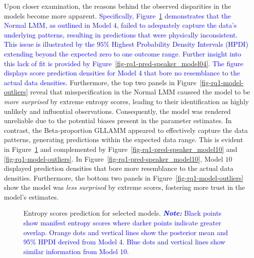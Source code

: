 \documentclass[
  authoryear,
  preprint,
  1p]{elsarticle}
\begin{document}
Upon closer examination, the reasons behind the observed disparities in
the models become more apparent. \textcolor{blue}{Specifically,
Figure~\ref{fig-rq1-pred-speaker} demonstrates that the Normal LMM, as
outlined in Model \(4\), failed to adequately capture the data's
underlying patterns, resulting in predictions that were physically
inconsistent. This issue is illustrated by the \(95\%\) Highest
Probability Density Intervals (HPDI) extending beyond the expected zero
to one outcome range. Further insight into this lack of fit is provided
by Figure~\ref{fig-rq1-pred-speaker_model04}. The figure displays score
prediction densities for Model \(4\) that bore no resemblance to the
actual data densities.} Furthermore, the top two panels in
Figure~\ref{fig-rq1-model-outliers} reveal that misspecification in the
Normal LMM causeed the model to be \emph{more surprised} by extreme
entropy scores, leading to their identification as highly unlikely and
influential observations. Consequently, the model was rendered
unreliable due to the potential biases present in the parameter
estimates. In contrast, the Beta-proportion GLLAMM appeared to
effectively capture the data patterns, generating predictions within the
expected data range. This is evident in
Figure~\ref{fig-rq1-pred-speaker} and complemented by
Figure~\ref{fig-rq1-pred-speaker_model10} and
\ref{fig-rq1-model-outliers}. In
Figure~\ref{fig-rq1-pred-speaker_model10}, Model \(10\) displayed
prediction densities that bore more resemblance to the actual data
densities. Furthermore, the bottom two panels in
Figure~\ref{fig-rq1-model-outliers} show the model was \emph{less
surprised} by extreme scores, fostering more trust in the model's
estimates.

\label{cell-fig-rq1-pred-speaker}
\begin{figure}[H]


\caption{\label{fig-rq1-pred-speaker}Entropy scores prediction for
selected models. \textcolor{blue}{\textbf{\emph{Note:}} Black points show manifest
entropy scores where darker points indicate greater overlap. Orange dots
and vertical lines show the posterior mean and 95\% HPDI derived from
Model 4. Blue dots and vertical lines show similar information from
Model 10.}}

\end{figure}%
\end{document}
